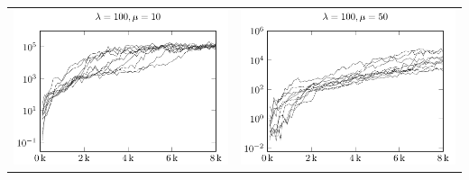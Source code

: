 \begin{tabular}{@{}l@{}l@{}}
\includegraphics[scale=1]{plots/ce_ConstantNoise_l100_o10_all} &
\includegraphics[scale=1]{plots/ce_ConstantNoise_l100_o50_all}
\end{tabular}

